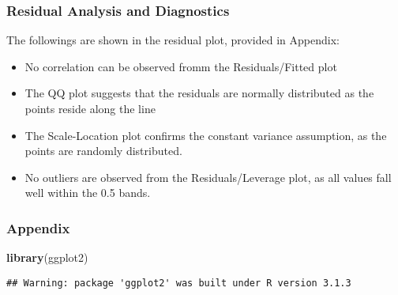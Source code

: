\documentclass[]{article}
\newenvironment{Shaded}{\begin{snugshade}}{\end{snugshade}}
\newcommand{\KeywordTok}[1]{\textcolor[rgb]{0.13,0.29,0.53}{\textbf{{#1}}}}
\newcommand{\DataTypeTok}[1]{\textcolor[rgb]{0.13,0.29,0.53}{{#1}}}
\newcommand{\DecValTok}[1]{\textcolor[rgb]{0.00,0.00,0.81}{{#1}}}
\newcommand{\StringTok}[1]{\textcolor[rgb]{0.31,0.60,0.02}{{#1}}}
\newcommand{\OtherTok}[1]{\textcolor[rgb]{0.56,0.35,0.01}{{#1}}}
\newcommand{\NormalTok}[1]{{#1}}
\begin{document}
\subsubsection{Residual Analysis and
Diagnostics}\label{residual-analysis-and-diagnostics}

The followings are shown in the residual plot, provided in Appendix:

\begin{itemize}
\itemsep1pt\parskip0pt
\item
  No correlation can be observed fromm the Residuals/Fitted plot
\item
  The QQ plot suggests that the residuals are normally distributed as
  the points reside along the line
\item
  The Scale-Location plot confirms the constant variance assumption, as
  the points are randomly distributed.
\item
  No outliers are observed from the Residuals/Leverage plot, as all
  values fall well within the 0.5 bands.
\end{itemize}

\subsubsection{Appendix}\label{appendix}

\begin{Shaded}
\begin{Highlighting}[]
\KeywordTok{library}\NormalTok{(ggplot2)}
\end{Highlighting}
\end{Shaded}

\begin{verbatim}
## Warning: package 'ggplot2' was built under R version 3.1.3
\end{verbatim}

\begin{Shaded}
\end{Shaded}
\end{document}

